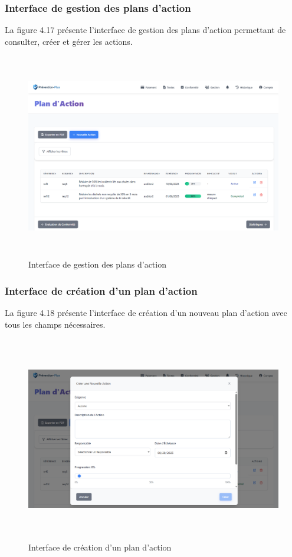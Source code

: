 \subsubsection{Interface de gestion des plans d'action}
\noindent La figure 4.17 présente l'interface de gestion des plans d'action permettant de consulter, créer et gérer les actions.

\begin{figure}[H]
    \centering
    \includegraphics[width=14cm,height=9cm]{images/actionplansinterface.PNG}
    \caption{Interface de gestion des plans d'action}
\end{figure}

\subsubsection{Interface de création d'un plan d'action}
\noindent La figure 4.18 présente l'interface de création d'un nouveau plan d'action avec tous les champs nécessaires.

\begin{figure}[H]
    \centering
    \includegraphics[width=14cm,height=9cm]{images/createactionmodal.PNG}
    \caption{Interface de création d'un plan d'action}
\end{figure}
